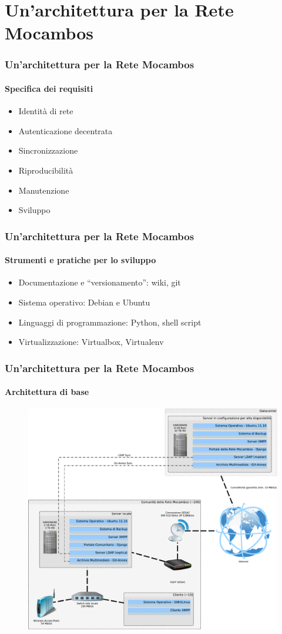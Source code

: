 \documentclass{beamer}
\begin{document}
\section{Un'architettura per la Rete Mocambos}

\begin{frame}
  \frametitle{Un'architettura per la Rete Mocambos}
  \framesubtitle{Specifica dei requisiti}
  \begin{itemize}
    \item Identità di rete
    \item Autenticazione decentrata
    \item Sincronizzazione
    \item Riproducibilità
    \item Manutenzione
    \item Sviluppo
    \end{itemize}

\end{frame}

\begin{frame}
  \frametitle{Un'architettura per la Rete Mocambos}
  \framesubtitle{Strumenti e pratiche per lo sviluppo}
  \begin{itemize}
    \item Documentazione e ``versionamento'': wiki, git
    \item Sistema operativo: Debian e Ubuntu
    \item Linguaggi di programmazione: Python, shell script
    \item Virtualizzazione: Virtualbox, Virtualenv
    \end{itemize}

\end{frame}

\begin{frame}
  \frametitle{Un'architettura per la Rete Mocambos}
  \framesubtitle{Architettura di base}
	\begin{figure}
		\includegraphics[height=0.7\textheight]{./Figure/SchemaServer_ReteMocambos-crop.pdf}
	\end{figure}
\end{frame}
\end{document}
